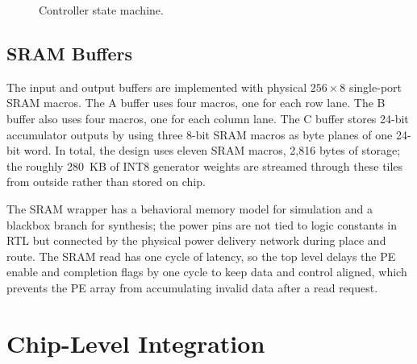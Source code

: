 \documentclass[conference,a4paper]{APSIPA2026}
\begin{document}
\begin{figure}[h]
\centering
{}
\caption{Controller state machine.}
\label{fig:fsm}
\end{figure}

\subsection{SRAM Buffers}
The input and output buffers are implemented with physical $256\times8$ single-port SRAM macros. The A buffer uses four macros, one for each row lane. The B buffer also uses four macros, one for each column lane. The C buffer stores 24-bit accumulator outputs by using three 8-bit SRAM macros as byte planes of one 24-bit word. In total, the design uses eleven SRAM macros, 2{,}816 bytes of storage; the roughly 280~KB of INT8 generator weights are streamed through these tiles from outside rather than stored on chip.

The SRAM wrapper has a behavioral memory model for simulation and a blackbox branch for synthesis; the power pins are not tied to logic constants in RTL but connected by the physical power delivery network during place and route. The SRAM read has one cycle of latency, so the top level delays the PE enable and completion flags by one cycle to keep data and control aligned, which prevents the PE array from accumulating invalid data after a read request.

\section{Chip-Level Integration}\label{sec:chip}
\end{document}
